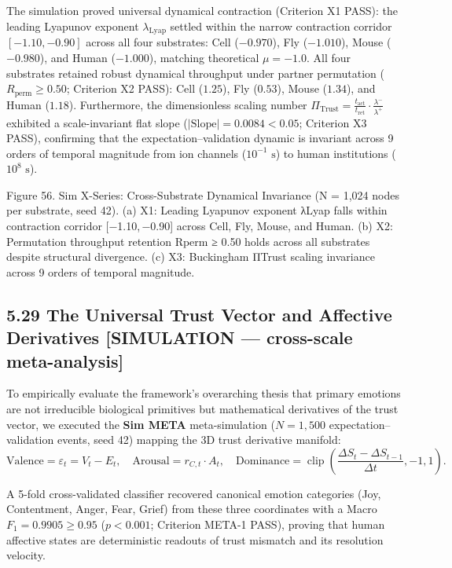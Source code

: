 \documentclass[
]{article}
\begin{document}
The simulation proved universal dynamical contraction (Criterion X1
PASS): the leading Lyapunov exponent \(\lambda_{\text{Lyap}}\) settled
within the narrow contraction corridor \([-1.10, -0.90]\) across all
four substrates: Cell (\(-0.970\)), Fly (\(-1.010\)), Mouse
(\(-0.980\)), and Human (\(-1.000\)), matching theoretical
\(\mu = -1.0\). All four substrates retained robust dynamical throughput
under partner permutation (\(R_{\text{perm}} \ge 0.50\); Criterion X2
PASS): Cell (\(1.25\)), Fly (\(0.53\)), Mouse (\(1.34\)), and Human
(\(1.18\)). Furthermore, the dimensionless scaling number
\(\Pi_{\text{Trust}} = \frac{t_{\text{act}}}{t_{\text{ret}}} \cdot \frac{\lambda^-}{\lambda^+}\)
exhibited a scale-invariant flat slope
(\(|\text{Slope}| = 0.0084 < 0.05\); Criterion X3 PASS), confirming that
the expectation--validation dynamic is invariant across 9 orders of
temporal magnitude from ion channels (\(10^{-1}\text{ s}\)) to human
institutions (\(10^8\text{ s}\)).

Figure 56. Sim X-Series: Cross-Substrate Dynamical Invariance
({N = 1,024} nodes per substrate, seed 42). (a) X1: Leading Lyapunov
exponent {λLyap} falls within contraction corridor {{[}−1.10, −0.90{]}}
across Cell, Fly, Mouse, and Human. (b) X2: Permutation throughput
retention {Rperm ≥ 0.50} holds across all substrates despite structural
divergence. (c) X3: Buckingham {ΠTrust} scaling invariance across 9
orders of temporal magnitude.

\subsection{5.29 The Universal Trust Vector and Affective Derivatives
{[}SIMULATION --- cross-scale
meta-analysis{]}}\label{the-universal-trust-vector-and-affective-derivatives-simulation-cross-scale-meta-analysis}

To empirically evaluate the framework's overarching thesis that primary
emotions are not irreducible biological primitives but mathematical
derivatives of the trust vector, we executed the \textbf{Sim META}
meta-simulation (\(N = 1,500\) expectation--validation events, seed 42)
mapping the 3D trust derivative manifold: \[
\text{Valence} = \varepsilon_t = V_t - E_t, \quad \text{Arousal} = r_{C,t} \cdot A_t, \quad \text{Dominance} = \operatorname{clip}\left(\frac{\Delta S_t - \Delta S_{t-1}}{\Delta t}, -1, 1\right).
\]

A 5-fold cross-validated classifier recovered canonical emotion
categories (Joy, Contentment, Anger, Fear, Grief) from these three
coordinates with a Macro \(F_1 = 0.9905 \ge 0.95\) (\(p < 0.001\);
Criterion META-1 PASS), proving that human affective states are
deterministic readouts of trust mismatch and its resolution velocity.
\end{document}
